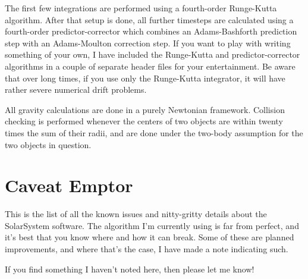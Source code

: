 \documentclass{article}
\begin{document}
The first few integrations are performed using a fourth-order Runge-Kutta algorithm.  After that setup is done, all further timesteps are calculated using a fourth-order predictor-corrector which combines an Adams-Bashforth prediction step with an Adams-Moulton correction step.  If you want to play with writing something of your own, I have included the Runge-Kutta and predictor-corrector algorithms in a couple of separate header files for your entertainment.  Be aware that over long times, if you use only the Runge-Kutta integrator, it will have rather severe numerical drift problems.

All gravity calculations are done in a purely Newtonian framework.  Collision checking is performed whenever the centers of two objects are within twenty times the sum of their radii, and are done under the two-body assumption for the two objects in question.

\section{Caveat Emptor}

This is the list of all the known issues and nitty-gritty details about the SolarSystem software.  The algorithm I'm currently using is far from perfect, and it's best that you know where and how it can break.  Some of these are planned improvements, and where that's the case, I have made a note indicating such.

If you find something I haven't noted here, then please let me know!
\end{document}
